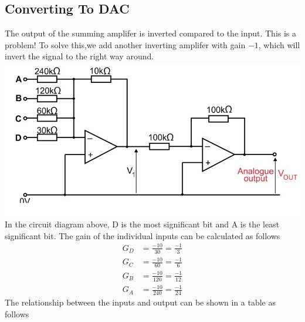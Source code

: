 \documentclass[a4paper,11pt, twocolumn]{article}
\begin{document}
\subsection{Converting To DAC}
The output of the summing amplifer is inverted compared to the input. This is a problem! To solve this,we add another inverting amplifer with gain $-1$, which will invert the signal to the right way around.
\includegraphics[width=\linewidth]{fullDAC.jpg}
In the circuit diagram above, D is the most significant bit and A is the least significant bit.
The gain of the individual inputs can be calculated as follows
\begin{align*}
    G_D &= \frac{-10}{30} = \frac{-1}{3}\\
    G_C &= \frac{-10}{60} = \frac{-1}{6}\\
    G_B &= \frac{-10}{120} = \frac{-1}{12}\\
    G_A &= \frac{-10}{240} = \frac{-1}{24}
\end{align*}
The relationship between the inputs and output can be shown in a table as follows
\end{document}
